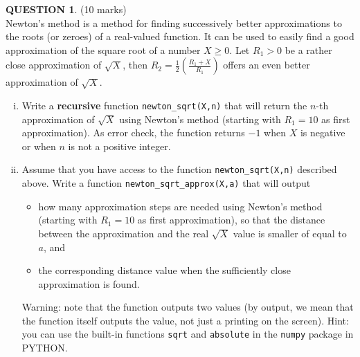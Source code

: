 \documentclass[a4paper,12pt]{article}
\theoremstyle{definition}
\newtheorem{ques}[dummy]{QUESTION}
\theoremstyle{plain}
\newcommand{\ttx}[1]{\texttt{#1}}
\newcommand{\bigbracket}[1]{\left( #1 \right)}
\begin{document}
\begin{ques}\hfill (10 marks)\vspace*{1em}\\
	Newton's method is a method for finding successively better approximations to the roots (or zeroes) of a real-valued function. It can be used to easily find a good approximation of the square root of a number $X\geq 0$. Let $R_1 > 0$ be a rather close approximation of $\sqrt{X}$, then $R_2 = \frac{1}{2}\bigbracket{\frac{R_1+X}{R_1}}$ offers an even better approximation of $\sqrt{X}$.
	
	\begin{enumerate}[(i)]
		\item Write a \textbf{recursive} function \ttx{newton\_sqrt(X,n)} that will return the $n$-th approximation of $\sqrt{X}$ using Newton's method (starting with $R_1 = 10$ as first approximation). As error check, the function returns $-1$ when $X$ is negative or when $n$ is not a positive integer.
		
		\item Assume that you have access to the function \ttx{newton\_sqrt(X,n)} described above. Write a function \ttx{newton\_sqrt\_approx(X,a)} that will output
		\begin{itemize}
			\item how many approximation steps are needed using Newton's method (starting with $R_1 = 10$ as first approximation), so that the distance between the approximation and the real $\sqrt{X}$ value is smaller of equal to $a$, and
			\item the corresponding distance value when the sufficiently close approximation is found.
		\end{itemize}
		Warning: note that the function outputs two values (by output, we mean that the function itself outputs the value, not just a printing on the screen). Hint: you can use the built-in functions \ttx{sqrt} and \ttx{absolute} in the \ttx{numpy} package in PYTHON.
	\end{enumerate}
\end{ques}
\end{document}
